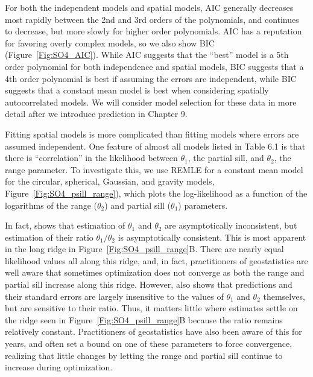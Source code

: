 \documentclass[12pt, titlepage]{article}
\begin{document}
For both the independent models and spatial models, AIC generally decreases most rapidly between the 2nd and 3rd orders of the polynomials, and continues to decrease, but more slowly for higher order polynomials. AIC has a reputation for favoring overly complex models, so we also show BIC (Figure~\ref{Fig:SO4_AIC}).  While AIC suggests that the ``best'' model is a 5th order polynomial for both independence and spatial models, BIC suggests that a 4th order polynomial is best if assuming the errors are independent, while BIC suggests that a constant mean model is best when considering spatially autocorrelated models.  We will consider model selection for these data in more detail after we introduce prediction in Chapter 9.

Fitting spatial models is more complicated than fitting models where errors are assumed independent.  One feature of almost all models listed in Table 6.1 is that there is ``correlation'' in the likelihood between $\theta_{1}$, the partial sill, and $\theta_{2}$, the range parameter.  To investigate this, we use REMLE for a constant mean model for the circular, spherical, Gaussian, and gravity models, Figure~\ref{Fig:SO4_psill_range}), which plots the log-likelihood as a function of the logarithms of the range ($\theta_{2}$) and partial sill ($\theta_{1}$) parameters.

In fact, \citet{zhang_inconsistent_2004} shows that estimation of $\theta_{1}$ and $\theta_{2}$ are asymptotically inconsistent, but estimation of their ratio $\theta_{1}/\theta_{2}$ is asymptotically consistent.  This is most apparent in the long ridge in Figure~\ref{Fig:SO4_psill_range}B. There are nearly equal likelihood values all along this ridge, and, in fact, practitioners of geostatistics are well aware that sometimes optimization does not converge as both the range and partial sill increase along this ridge. However, \citet{zhang_inconsistent_2004} also shows that predictions and their standard errors are largely insensitive to the values of $\theta_{1}$ and $\theta_{2}$ themselves, but are sensitive to their ratio.  Thus, it matters little where estimates settle on the ridge seen in Figure~\ref{Fig:SO4_psill_range}B because the ratio remains relatively constant.  Practitioners of geostatistics have also been aware of this for years, and often set a bound on one of these parameters to force convergence, realizing that little changes by letting the range and partial sill continue to increase during optimization.
\end{document}
